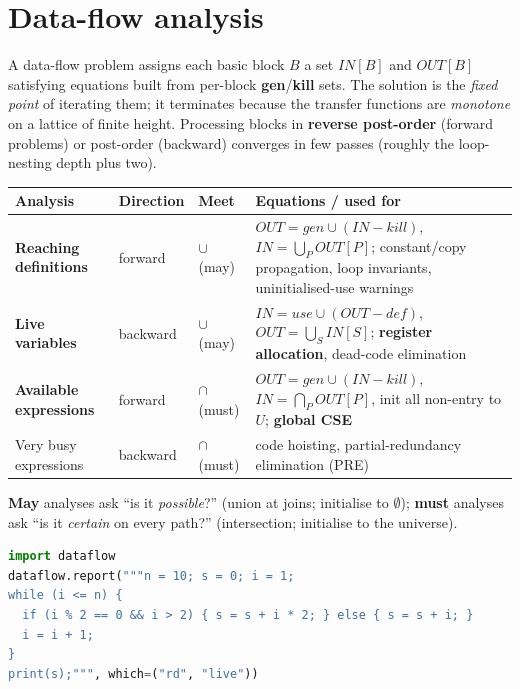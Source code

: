 \documentclass[10pt,a4paper,openany,oneside]{report}
\newcommand{\prio}[1]{\texorpdfstring{\ifcase#1\or{\color{gold}\ding{72}}\or{\color{gold}\ding{72}\ding{72}}\or{\color{gold}\ding{72}\ding{72}\ding{72}}\fi}{}}
\begin{document}
\section{Data-flow analysis \prio{3}}
\begin{mustbox}
A data-flow problem assigns each basic block $B$ a set $IN[B]$ and $OUT[B]$ satisfying equations built from per-block \textbf{gen}/\textbf{kill} sets. The solution is the \emph{fixed point} of iterating them; it terminates because the transfer functions are \emph{monotone} on a lattice of finite height. Processing blocks in \textbf{reverse post-order} (forward problems) or post-order (backward) converges in few passes (roughly the loop-nesting depth plus two).
\begin{center}\small
\begin{xltabular}{\textwidth}{@{}L{2.9cm}L{1.9cm}L{1.7cm}Y@{}}
\toprule
\textbf{Analysis} & \textbf{Direction} & \textbf{Meet} & \textbf{Equations / used for}\\
\midrule\endhead
\textbf{Reaching definitions} & forward & $\cup$ (may) & $OUT=gen\cup(IN-kill)$, $IN=\bigcup_{P}OUT[P]$; constant/copy propagation, loop invariants, uninitialised-use warnings\\
\textbf{Live variables} & backward & $\cup$ (may) & $IN=use\cup(OUT-def)$, $OUT=\bigcup_{S}IN[S]$; \textbf{register allocation}, dead-code elimination\\
\textbf{Available expressions} & forward & $\cap$ (must) & $OUT=gen\cup(IN-kill)$, $IN=\bigcap_{P}OUT[P]$, init all non-entry to $U$; \textbf{global CSE}\\
Very busy expressions & backward & $\cap$ (must) & code hoisting, partial-redundancy elimination (PRE)\\
\bottomrule
\end{xltabular}
\end{center}
\textbf{May} analyses ask ``is it \emph{possible}?'' (union at joins; initialise to $\emptyset$); \textbf{must} analyses ask ``is it \emph{certain} on every path?'' (intersection; initialise to the universe).
\end{mustbox}
\begin{lstlisting}[language={Python},title={Reaching definitions and live variables on the loop CFG (iterated to a fixed point)}]
import dataflow
dataflow.report("""n = 10; s = 0; i = 1;
while (i <= n) {
  if (i % 2 == 0 && i > 2) { s = s + i * 2; } else { s = s + i; }
  i = i + 1;
}
print(s);""", which=("rd", "live"))
\end{lstlisting}
\end{document}
